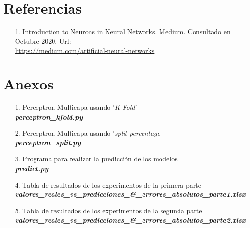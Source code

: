 \documentclass[12pt,a4paper, xcolor=table]{article}
\begin{document}
\section{Referencias}
    \begin{itemize}
        \item [1.] Introduction to Neurons in Neural Networks. Medium. Consultado en Octubre 2020. Url: \\
        \href{https://medium.com/artificial-neural-networks/introduction-to-neurons-in-neural-networks-71828d040a65}{https://medium.com/artificial-neural-networks}
    \end{itemize}
\printindex



  \section{Anexos}
  \begin{itemize}
    \item [1.] Perceptron Multicapa usando '\textit{K Fold}'\\
    \textbf{\textit{perceptron\_kfold.py}}
    \item [2.] Perceptron Multicapa usando '\textit{split percentage}'\\
    \textbf{\textit{perceptron\_split.py}}
    \item [3.] Programa para realizar la predicción de los modelos\\
    \textbf{\textit{predict.py}}
    \item [4.] Tabla de resultados de los experimentos de la primera parte\\
    \textbf{\textit{valores\_reales\_vs\_predicciones\_\&\_errores\_absolutos\_parte1.xlsx}}
    \item [5.] Tabla de resultados de los experimentos de la segunda parte\\
    \textbf{\textit{valores\_reales\_vs\_predicciones\_\&\_errores\_absolutos\_parte2.xlsx}}
  \end{itemize}
\end{document}
